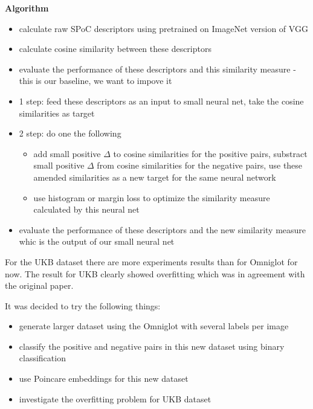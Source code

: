 \documentclass[a4paper,12pt]{extreport}
\begin{document}
    \textbf{Algorithm}
    \begin{itemize}
        \item {calculate raw SPoC descriptors using pretrained on ImageNet version of VGG}
        \item {calculate cosine similarity between these descriptors}
        \item {evaluate the performance of these descriptors and this similarity measure - this is our baseline, we want to impove it}
        \item {1 step: feed these descriptors as an input to small neural net, take the cosine similarities as target}
        \item {2 step: do one the following \begin{itemize}
                                                \item {add small positive $\Delta$ to cosine similarities for the positive pairs,
                                                substract small positive $\Delta$ from cosine similarities for the negative pairs,
                                                use these amended similarities as a new target for the same neural network}
                                                \item {use histogram or margin loss to optimize the similarity measure calculated by this neural net}
        \end{itemize}}
        \item {evaluate the performance of these descriptors and the new similarity measure whic is the output of our small neural net}
    \end{itemize}


    For the UKB dataset there are more experiments results than for Omniglot for now.
    The result for UKB clearly showed overfitting which was in agreement with the original paper.

    It was decided to try the following things:
    \begin{itemize}
        \item {generate larger dataset using the Omniglot with several labels per image}
        \item {classify the positive and negative pairs in this new dataset using binary classification}
        \item {use Poincare embeddings for this new dataset}
        \item {investigate the overfitting problem for UKB dataset}
    \end{itemize}
\end{document}
